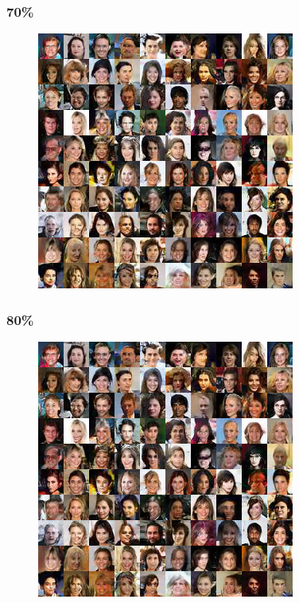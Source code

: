 \documentclass[dvipdfmx,12pt]{beamer}
\begin{document}
\begin{frame}
	\frametitle{70\%}
	\begin{figure}[htbp]
	\begin{center}
	\includegraphics[width=0.7\hsize]{./sndcgan/image00070000.png}
	\end{center}
	\end{figure}
\end{frame}
\begin{frame}
	\frametitle{80\%}
	\begin{figure}[htbp]
	\begin{center}
	\includegraphics[width=0.7\hsize]{./sndcgan/image00080000.png}
	\end{center}
	\end{figure}
\end{frame}
\end{document}

